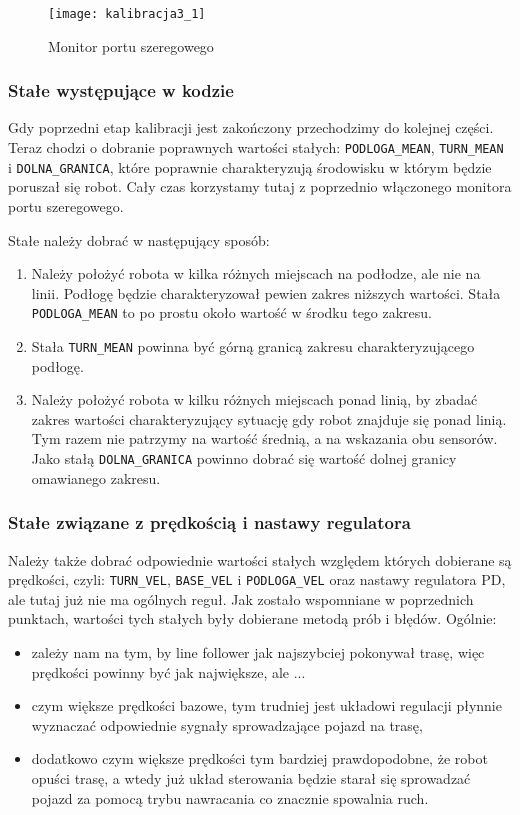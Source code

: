\documentclass[11pt]{article}
\begin{document}
\begin{figure}[h!]
	\centering
	\texttt{[image: kalibracja3\_1]}
	\caption{Monitor portu szeregowego \label{fig:kalibracja}}
\end{figure}

\subsubsection{Stałe występujące w kodzie}

Gdy poprzedni etap kalibracji jest zakończony przechodzimy do kolejnej części. Teraz chodzi o dobranie poprawnych wartości stałych: \texttt{PODLOGA\_MEAN}, \texttt{TURN\_MEAN} i \texttt{DOLNA\_GRANICA}, które poprawnie charakteryzują środowisku w którym będzie poruszał się robot. Cały czas korzystamy tutaj z poprzednio włączonego monitora portu szeregowego.

Stałe należy dobrać w następujący sposób:
\begin{enumerate}
\item Należy położyć robota w kilka różnych miejscach na podłodze, ale nie na linii. Podłogę będzie charakteryzował pewien zakres niższych wartości. Stała \texttt{PODLOGA\_MEAN} to po prostu około wartość w środku tego zakresu.
\item Stała \texttt{TURN\_MEAN} powinna być górną granicą zakresu charakteryzującego podłogę.
\item Należy położyć robota w kilku różnych miejscach ponad linią, by zbadać zakres wartości charakteryzujący sytuację gdy robot znajduje się ponad linią. Tym razem nie patrzymy na wartość średnią, a na wskazania obu sensorów. Jako stałą \texttt{DOLNA\_GRANICA} powinno dobrać się wartość dolnej granicy omawianego zakresu.
\end{enumerate}

\subsubsection{Stałe związane z prędkością i nastawy regulatora}
Należy także dobrać odpowiednie wartości stałych względem których dobierane są prędkości, czyli: \texttt{TURN\_VEL}, \texttt{BASE\_VEL} i \texttt{PODLOGA\_VEL} oraz nastawy regulatora PD, ale tutaj już nie ma ogólnych reguł. Jak zostało wspomniane w poprzednich punktach, wartości tych stałych były dobierane metodą prób i błędów. Ogólnie:
\begin{itemize}
\item zależy nam na tym, by line follower jak najszybciej pokonywał trasę, więc prędkości powinny być jak największe, ale ...
\item czym większe prędkości bazowe, tym trudniej jest układowi regulacji płynnie wyznaczać odpowiednie sygnały sprowadzające pojazd na trasę,
\item dodatkowo czym większe prędkości tym bardziej prawdopodobne, że robot opuści trasę, a wtedy już układ sterowania będzie starał się sprowadzać pojazd za pomocą trybu nawracania co znacznie spowalnia ruch.
\end{itemize}
\end{document}
